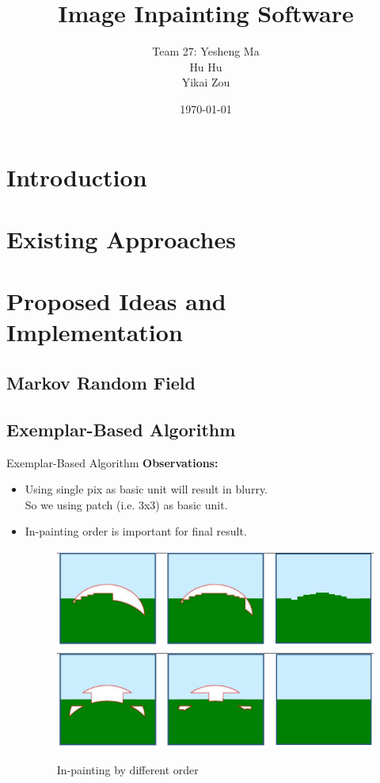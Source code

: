 \documentclass{beamer}
\title{Image Inpainting Software}
\author{Team 27: Yesheng Ma\\\hspace{0.9cm}Hu Hu\\\hspace{1.4cm}Yikai Zou}
\institute[SJTU]{}
\date{\today}
\begin{document}
\begin{frame}
\titlepage
\end{frame}



\section{Introduction}


\section{Existing Approaches}


\section{Proposed Ideas and Implementation}
\subsection{Markov Random Field}

\subsection{Exemplar-Based Algorithm}
\begin{frame}{Exemplar-Based Algorithm}
	\textbf{Observations:}
	\begin{itemize}[<+->]
		\item Using single pix as basic unit will result in blurry. \\So we using patch (i.e. 3x3) as basic unit.
		\item In-painting order is important for final result. 
		\begin{figure}
			\centering
			\includegraphics[width=0.8\linewidth]{order1.png}\\
			\includegraphics[width=0.8\linewidth]{order2.png}
			\caption{In-painting by different order}
		\end{figure}
	\end{itemize}
\end{frame}
\end{document}
